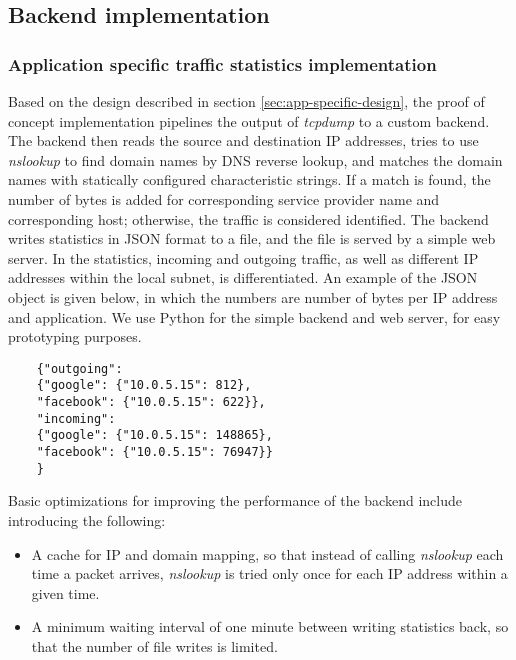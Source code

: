 \subsection{Backend implementation}

\subsubsection{Application specific traffic statistics implementation}

Based on the design described in section \ref{sec:app-specific-design}, the proof of concept implementation pipelines the output of \textit{tcpdump} to a custom backend. The backend then reads the source and destination IP addresses, tries to use \textit{nslookup} to find domain names by DNS reverse lookup, and matches the domain names with statically configured characteristic strings. If a match is found, the number of bytes is added for corresponding service provider name and corresponding host; otherwise, the traffic is considered identified. The backend writes statistics in JSON format to a file, and the file is served by a simple web server. In the statistics, incoming and outgoing traffic, as well as different IP addresses within the local subnet, is differentiated. An example of the JSON object is given below, in which the numbers are number of bytes per IP address and application. We use Python for the simple backend and web server, for easy prototyping purposes.

\begin{listing}
	\begin{verbatim}
	{"outgoing": 
	{"google": {"10.0.5.15": 812}, 
	"facebook": {"10.0.5.15": 622}}, 
	"incoming": 
	{"google": {"10.0.5.15": 148865}, 
	"facebook": {"10.0.5.15": 76947}}
	}
	\end{verbatim}
\end{listing}

Basic optimizations for improving the performance of the backend include introducing the following:
\begin{itemize}
	
	\item A cache for IP and domain mapping, so that instead of calling \textit{nslookup} each time a packet arrives, \textit{nslookup} is tried only once for each IP address within a given time.
	
	\item A minimum waiting interval of one minute between writing statistics back, so that the number of file writes is limited.
	
\end{itemize}